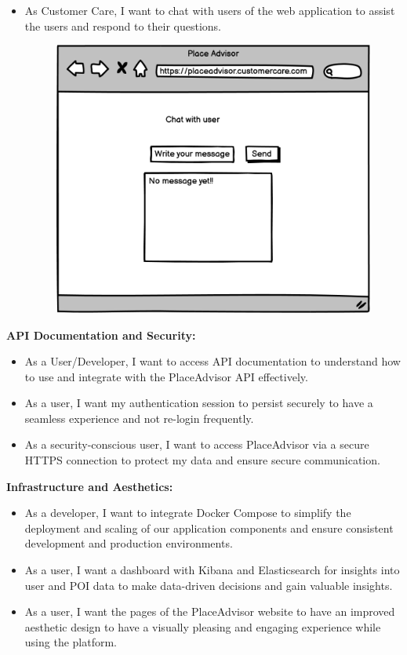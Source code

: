 \documentclass[../main.tex]{subfiles}
\begin{document}
\begin{itemize}
\begin{figure}[h]
\begin{multicols}{2}
    \end{multicols}
\end{figure}
\pagebreak
  \item As Customer Care, I want to chat with users of the web application to assist the users and respond to their questions.
  \begin{figure}[H]
	\centering
	\label{fig:pngegg}
	\includegraphics[width=0.5\linewidth]{../figures/mockup/US10 copy 3.png}
  \end{figure}
\end{itemize}


\textbf{API Documentation and Security:}
\begin{itemize}
  \item As a User/Developer, I want to access API documentation to understand how to use and integrate with the PlaceAdvisor API effectively.
  \item As a user, I want my authentication session to persist securely to have a seamless experience and not re-login frequently.
  \item As a security-conscious user, I want to access PlaceAdvisor via a secure HTTPS connection to protect my data and ensure secure communication.
\end{itemize}

\textbf{Infrastructure and Aesthetics:}
\begin{itemize}
  \item As a developer, I want to integrate Docker Compose to simplify the deployment and scaling of our application components and ensure consistent development and production environments.
  \item As a user, I want a dashboard with Kibana and Elasticsearch for insights into user and POI data to make data-driven decisions and gain valuable insights.
  \item As a user, I want the pages of the PlaceAdvisor website to have an improved aesthetic design to have a visually pleasing and engaging experience while using the platform.
\end{itemize}
\end{document}
